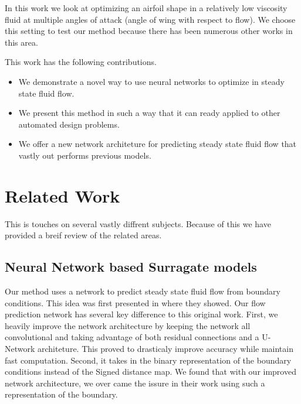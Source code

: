\documentclass{article} %
\begin{document}
In this work we look at optimizing an airfoil shape in a relatively low viscosity fluid at multiple angles of attack (angle of wing with respect to flow). We choose this setting to test our method because there has been numerous other works in this area. 







This work has the following contributions.
\begin{itemize}
  \item We demonstrate a novel way to use neural networks to optimize  in steady state fluid flow.
  \item We present this method in such a way that it can ready applied to other automated design problems.
  \item We offer a new network architeture for predicting steady state fluid flow that vastly out performs previous models.
\end{itemize}

\section{Related Work}

This is touches on several vastly diffrent subjects. Because of this we have provided a breif review of the related areas.

\subsection{Neural Network based Surragate models}


Our method uses a network to predict steady state fluid flow from boundary conditions. This idea was first presented in \citep{guo2016convolutional} where they showed. Our flow prediction network has several key difference to this original work. First, we heavily improve the network architecture by keeping the network all convolutional and taking advantage of both residual connections and a U-Network architeture. This proved to drasticaly improve accuracy while maintain fast computation. Second, it takes in the binary representation of the boundary conditions instead of the Signed distance map. We found that with our improved network architecture, we over came the issure in their work using such a representation of the boundary.
\end{document}
